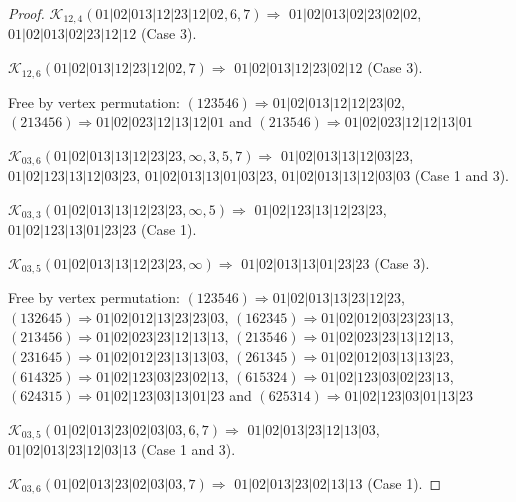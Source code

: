 \documentclass[12pt]{article}
\theoremstyle{plain}
\theoremstyle{definition}
\theoremstyle{remark}
\newcommand{\fancy}[1]{\mathcal{#1}}
\def\K{\fancy{K}}
\begin{document}
\begin{proof}
	
	
	\bigskip
	
	$\K_{12,4}(01|02|013|12|23|12|02,6, 7)\Rightarrow $ $01|02|013|02|23|02|02$, $01|02|013|02|23|12|12$ (Case 3).
	
	$\K_{12,6}(01|02|013|12|23|12|02,7)\Rightarrow $ $01|02|013|12|23|02|12$ (Case 3).
	
	
	
	Free by vertex permutation: $(1 2 3 5 4 6)\Rightarrow 01|02|013|12|12|23|02$, $(2 1 3 4 5 6)\Rightarrow 01|02|023|12|13|12|01$ and $(2 1 3 5 4 6)\Rightarrow 01|02|023|12|12|13|01$
	
	
	
	\bigskip
	
	$\K_{03,6}(01|02|013|13|12|23|23,\infty,3, 5, 7)\Rightarrow $ $01|02|013|13|12|03|23$, $01|02|123|13|12|03|23$, $01|02|013|13|01|03|23$, $01|02|013|13|12|03|03$ (Case 1 and 3).
	
	$\K_{03,3}(01|02|013|13|12|23|23,\infty,5)\Rightarrow $ $01|02|123|13|12|23|23$, $01|02|123|13|01|23|23$ (Case 1).
	
	$\K_{03,5}(01|02|013|13|12|23|23,\infty)\Rightarrow $ $01|02|013|13|01|23|23$ (Case 3).
	
	
	
	Free by vertex permutation: $(1 2 3 5 4 6)\Rightarrow 01|02|013|13|23|12|23$, $(1 3 2 6 4 5)\Rightarrow 01|02|012|13|23|23|03$, $(1 6 2 3 4 5)\Rightarrow 01|02|012|03|23|23|13$, $(2 1 3 4 5 6)\Rightarrow 01|02|023|23|12|13|13$, $(2 1 3 5 4 6)\Rightarrow 01|02|023|23|13|12|13$, $(2 3 1 6 4 5)\Rightarrow 01|02|012|23|13|13|03$, $(2 6 1 3 4 5)\Rightarrow 01|02|012|03|13|13|23$, $(6 1 4 3 2 5)\Rightarrow 01|02|123|03|23|02|13$, $(6 1 5 3 2 4)\Rightarrow 01|02|123|03|02|23|13$, $(6 2 4 3 1 5)\Rightarrow 01|02|123|03|13|01|23$ and $(6 2 5 3 1 4)\Rightarrow 01|02|123|03|01|13|23$
	
	
	
	\bigskip
	
	$\K_{03,5}(01|02|013|23|02|03|03,6, 7)\Rightarrow $ $01|02|013|23|12|13|03$, $01|02|013|23|12|03|13$ (Case 1 and 3).
	
	$\K_{03,6}(01|02|013|23|02|03|03,7)\Rightarrow $ $01|02|013|23|02|13|13$ (Case 1).
	
	
	

\end{proof}
\end{document}

